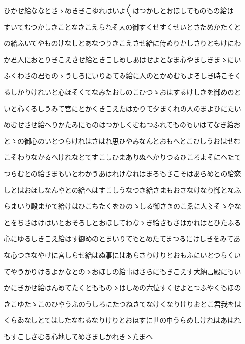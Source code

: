 \documentclass[a4paper,11pt,landscape]{ltjtarticle}
\begin{document}
\par\medskip
ひかせ給ななとさゝめききこゆれはいよ〱はつかしとおほしてものもの給は
\par\medskip
すいてむつかしきことなきこえられそ人の御すくせすくせいとさためかたくと
\par\medskip
の給ふいてやものけなしとあなつりきこえさせ給に侍めりかしさりともけにわ
\par\medskip
か君人におとりきこえさせ給ときこしめしあはせよとなま心やましきまゝにい
\par\medskip
ふくわさの君ものゝうしろにいりゐてみ給に人のとかめむもよろしき時こそく
\par\medskip
るしかりけれいと心ほそくてなみたおしのこひつゝおはするけしきを御めのと
\par\medskip
いと心くるしうみて宮にとかくきこえたはかりて夕まくれの人のまよひにたい
\par\medskip
めむせさせ給へりかたみにものはつかしくむねつふれてものもいはてなき給お
\par\medskip
とゝの御心のいとつらけれはさはれ思ひやみなんとおもへとこひしうおはせむ
\par\medskip
こそわりなかるへけれなとてすこしひまありぬへかりつるひころよそにへたて
\par\medskip
つらむとの給さまもいとわかうあはれけなれはまろもさこそはあらめとの給恋
\par\medskip
しとはおほしなんやとの給へはすこしうなつき給さまもおさなけなり御となふ
\par\medskip
らまいり殿まかて給けはひこちたくをひのゝしる御さきのこゑに人〻そゝやな
\par\medskip
とをちさはけはいとおそろしとおほしてわなゝき給さもさはかれはとひたふる
\par\medskip
心にゆるしきこえ給はす御めのとまいりてもとめたてまつるにけしきをみてあ
\par\medskip
な心つきなやけに宮しらせ給はぬ事にはあらさりけりとおもふにいとつらくい
\par\medskip
てやうかりけるよかなとのゝおほしの給事はさらにもきこえす大納言殿にもい
\par\medskip
かにきかせ給はんめてたくともものゝはしめの六位すくせよとつふやくもほの
\par\medskip
きこゆたゝこのひやうふのうしろにたつねきてなけくなりけりおとこ君我をは
\par\medskip
くらゐなしとてはしたなむるなりけりとおほすに世の中うらめしけれはあはれ
\par\medskip
もすこしさむる心地してめさましかれきゝたまへ
\par\medskip
\end{document}
